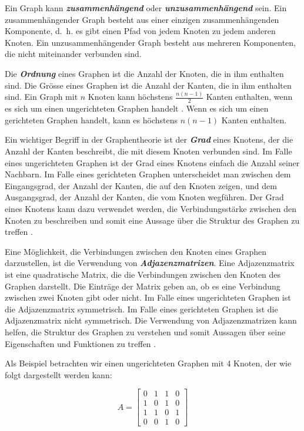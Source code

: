 Ein Graph kann \textbf{\textit{zusammenhängend}} oder \textbf{\textit{unzusammenhängend}} sein.
Ein zusammenhängender Graph besteht aus einer einzigen zusammenhängenden Komponente, d. h. es gibt einen Pfad von jedem Knoten zu jedem anderen Knoten.
Ein unzusammenhängender Graph besteht aus mehreren Komponenten, die nicht miteinander verbunden sind.

Die \textbf{\textit{Ordnung}} eines Graphen ist die Anzahl der Knoten, die in ihm enthalten sind.
Die Grösse eines Graphen ist die Anzahl der Kanten, die in ihm enthalten sind.
Ein Graph mit $n$ Knoten kann höchstens $\frac{n(n-1)}{2}$ Kanten enthalten, wenn es sich um einen ungerichteten Graphen handelt \cite[p.~48]{barabasi_network_2016}.
Wenn es sich um einen gerichteten Graphen handelt, kann es höchstens $n(n-1)$ Kanten enthalten.

Ein wichtiger Begriff in der Graphentheorie ist der \textbf{\textit{Grad}} eines Knotens, der die Anzahl der Kanten beschreibt, die mit diesem Knoten verbunden sind. Im Falle eines ungerichteten Graphen ist der Grad eines Knotens einfach die Anzahl seiner Nachbarn. Im Falle eines gerichteten Graphen unterscheidet man zwischen dem Eingangsgrad, der Anzahl der Kanten, die auf den Knoten zeigen, und dem Ausgangsgrad, der Anzahl der Kanten, die vom Knoten wegführen. Der Grad eines Knotens kann dazu verwendet werden, die Verbindungsstärke zwischen den Knoten zu beschreiben und somit eine Aussage über die Struktur des Graphen zu treffen \cite[p.~48]{barabasi_network_2016} \cite[p.~14]{harary_graph_1994}.

Eine Möglichkeit, die Verbindungen zwischen den Knoten eines Graphen darzustellen, ist die Verwendung von \textbf{\textit{Adjazenzmatrizen}}. Eine Adjazenzmatrix ist eine quadratische Matrix, die die Verbindungen zwischen den Knoten des Graphen darstellt. Die Einträge der Matrix geben an, ob es eine Verbindung zwischen zwei Knoten gibt oder nicht. Im Falle eines ungerichteten Graphen ist die Adjazenzmatrix symmetrisch. Im Falle eines gerichteten Graphen ist die Adjazenzmatrix nicht symmetrisch. Die Verwendung von Adjazenzmatrizen kann helfen, die Struktur des Graphen zu verstehen und somit Aussagen über seine Eigenschaften und Funktionen zu treffen \cite[p.~51]{barabasi_network_2016} \cite[p.~151]{harary_graph_1994}.

Als Beispiel betrachten wir einen ungerichteten Graphen mit 4 Knoten, der wie folgt dargestellt werden kann:

\[
    A =
    \begin{bmatrix}
        0 & 1 & 1 & 0 \\
        1 & 0 & 1 & 0 \\
        1 & 1 & 0 & 1 \\
        0 & 0 & 1 & 0
    \end{bmatrix}
\]

